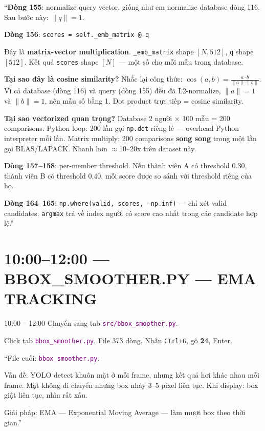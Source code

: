 \documentclass[12pt, a4paper]{article}
\newcommand{\fpath}[1]{\texttt{\textcolor{purple}{#1}}}
\begin{document}
\begin{say}
``\textbf{Dòng 155}: normalize query vector, giống như em normalize database dòng 116.
Sau bước này: $\|q\| = 1$.

\textbf{Dòng 156}: \texttt{scores = self.\_emb\_matrix @ q}

Đây là \textbf{matrix-vector multiplication}.
\texttt{\_emb\_matrix} shape $[N, 512]$, \texttt{q} shape $[512]$.
Kết quả \texttt{scores} shape $[N]$ --- một số cho mỗi mẫu trong database.

\textbf{Tại sao đây là cosine similarity?}
Nhắc lại công thức: $\cos(a, b) = \frac{a \cdot b}{\|a\| \cdot \|b\|}$.
Vì cả database (dòng 116) và query (dòng 155) đều đã L2-normalize,
$\|a\| = 1$ và $\|b\| = 1$, nên mẫu số bằng 1.
Dot product trực tiếp = cosine similarity.

\textbf{Tại sao vectorized quan trọng?}
Database 2 người × 100 mẫu = 200 comparisons.
Python loop: 200 lần gọi \texttt{np.dot} riêng lẻ --- overhead Python interpreter mỗi lần.
Matrix multiply: 200 comparisons \textbf{song song} trong một lần gọi BLAS/LAPACK.
Nhanh hơn $\approx$10--20x trên dataset này.

\textbf{Dòng 157--158}: per-member threshold.
Nếu thành viên A có threshold 0.30, thành viên B có threshold 0.40,
mỗi score được so sánh với threshold riêng của họ.

\textbf{Dòng 164--165}: \texttt{np.where(valid, scores, -np.inf)} --- chỉ xét valid candidates.
\texttt{argmax} trả về index người có score cao nhất trong các candidate hợp lệ.''
\end{say}

\section{10:00--12:00 --- BBOX\_SMOOTHER.PY --- EMA TRACKING}

\begin{timing}{10:00 -- 12:00}
Chuyển sang tab \fpath{src/bbox\_smoother.py}.
\end{timing}

\begin{doact}
Click tab \fpath{bbox\_smoother.py}. File 373 dòng.
Nhấn \texttt{Ctrl+G}, gõ \textbf{24}, Enter.
\end{doact}

\begin{say}
``File cuối: \fpath{bbox\_smoother.py}.

Vấn đề: YOLO detect khuôn mặt ở mỗi frame, nhưng kết quả hơi khác nhau mỗi frame.
Mặt không di chuyển nhưng box nhảy 3--5 pixel liên tục.
Khi display: box giật liên tục, nhìn rất xấu.

Giải pháp: EMA --- Exponential Moving Average --- làm mượt box theo thời gian.''
\end{say}
\end{document}
